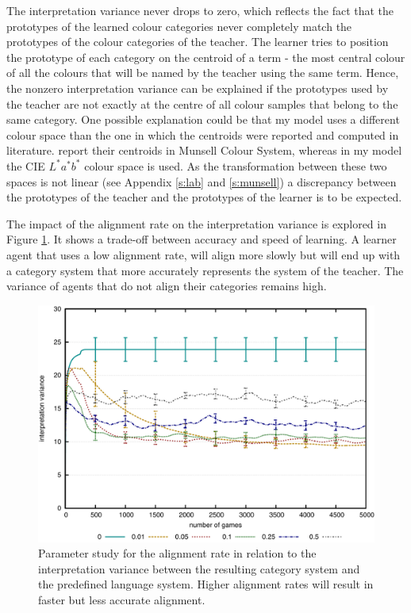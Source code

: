 The interpretation variance never drops to zero, which reflects the
fact that the prototypes of the learned colour categories never
completely match the prototypes of the colour categories of the
teacher. The learner tries to position the prototype of each category
on the centroid of a term - the most central colour of all the colours that will
be named by the teacher using the same term. Hence, the nonzero
interpretation variance can be explained if the prototypes used by the
teacher are not exactly at the centre of all colour samples that
belong to the same category. One possible explanation could be that
my model uses a different colour space than the one in which the
centroids were reported and computed in literature. \cite{sturges95location}
report their centroids in Munsell Colour System, 
whereas in my model the CIE $L^*a^*b^*$ colour space is used. 
As the transformation between these two spaces is not linear 
(see Appendix \ref{s:lab} and \ref{s:munsell}) a discrepancy between the prototypes 
of the teacher and the prototypes of the learner is to be expected.

The impact of the alignment rate on the interpretation variance is
explored in Figure
\ref{f:basic-strategy-alignment-rate-vs-variance}. It shows a
trade-off between accuracy and speed of learning. A learner agent that
uses a low alignment rate, will align more slowly but will end up
with a category system that more accurately represents the system of
the teacher. The variance of agents that do not align their categories
remains high.

\begin{figure}[htbp]
  \begin{center}
    \includegraphics[width=.9\textwidth]{./basic-operators/figures/alignment-rate-vs-variance.pdf}
    \caption[Parameter study for alignment rate]{Parameter study for
      the alignment rate in relation to the interpretation variance
      between the resulting category system and the predefined
      language system. Higher alignment rates will result in faster
      but less accurate alignment.}
    \label{f:basic-strategy-alignment-rate-vs-variance}
  \end{center}
\end{figure}

